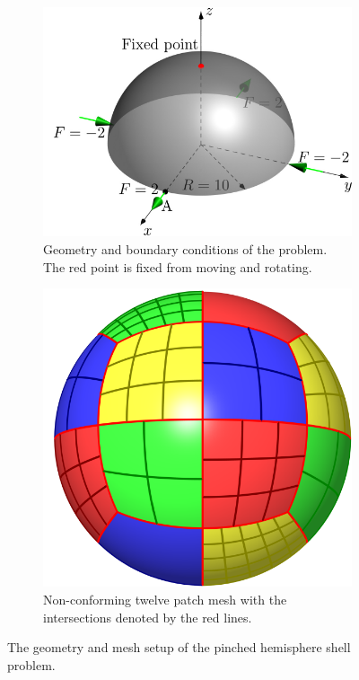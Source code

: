 \begin{figure}[h]
	\centering
	\captionsetup[subfigure]{font = footnotesize}
	\begin{subfigure}[b]{.48\textwidth}
		\centering
		\includegraphics[width = \textwidth]{hemisphere_config}
		\caption{Geometry and boundary conditions of the problem. The red point is fixed from moving and rotating.}\label{fig:hemisphere-config}
	\end{subfigure}\hfil
	\begin{subfigure}[b]{.48\textwidth}
		\centering
		\includegraphics[width = .7\textwidth]{hemisphere_decompose}
		\caption{Non-conforming twelve patch mesh with the intersections denoted by the red lines.}\label{fig:hemisphere_decompose-2}
	\end{subfigure}
	\caption{The geometry and mesh setup of the pinched hemisphere shell problem.}\label{fig:hemisphere}
\end{figure}

